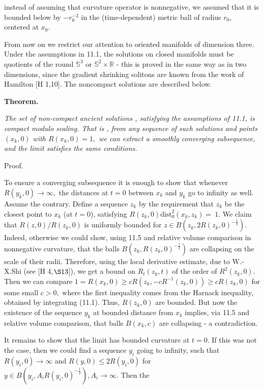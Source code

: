 \documentclass[12pt]{article}
\theoremstyle{plain}
{\swapnumbers
\newtheorem{thm}{Theorem}[section]
\newtheorem{cor}[thm]{Corollary}
\newtheorem{lem}[thm]{Lemma}
\newtheorem{prop}[thm]{Proposition}
}
\theoremstyle{definition}
{\swapnumbers
\newtheorem{defn}[thm]{Definition}
\newtheorem{nota}[thm]{Notation}
\newtheorem{parag}[thm]{}
\newtheorem*{parstr}{\addtocounter{thm}{1}\thesection.\arabic{thm}*}
\newtheorem*{intropar}{\addtocounter{thm}{1}\arabic{thm}}
}
\theoremstyle{remark} {\swapnumbers
\newtheorem{rem}[thm]{Remark}
\newtheorem{exam}[thm]{Example}
\newtheorem{lemma}[thm]{Lemma}
\newtheorem{claim}[thm]{Claim}
}
\numberwithin{equation}{section}
\begin{document}
 instead of assuming that curvature operator is nonnegative, we
 assumed that it is bounded below by $-r_0^{-2}$ in the
 (time-dependent) metric ball of radius $r_0,$ centered at $x_0.$
 \begin{parag} From now on we restrict our attention to oriented manifolds of dimension
  three. Under the assumptions in 11.1, the solutions on closed
  manifolds must be quotients of the round $\mathbb{S}^3$ or $\mathbb{S}^2\times\mathbb{R}$ - this is proved
  in the same way as in two dimensions, since the gradient
  shrinking solitons are known from the work of Hamilton [H 1,10]. The
  noncompact solutions are described below.
  \par
  {\bf Theorem.}{\it The set of non-compact ancient solutions , satisfying the
  assumptions of 11.1, is compact modulo scaling. That is , from
  any sequence of such solutions and points $(x_k,0)$ with
  $R(x_k,0)=1,$ we can extract a smoothly converging subsequence,
  and the limit satisfies the same conditions. \par Proof.} To
  ensure a converging subsequence it is enough to show that
  whenever $R(y_k,0)\to\infty,$ the distances at $t=0$ between
  $x_k$ and $y_k$ go to infinity as well. Assume the contrary.
  Define a sequence $z_k$ by the requirement that $z_k$ be the
  closest point to $x_k$ (at $t=0$), satisfying
  $R(z_k,0)\mbox{dist}_0^2(x_k,z_k)=~1.$ We claim that
  $R(z,0)/R(z_k,0)$ is uniformly bounded for
  $z\in B(z_k,2R(z_k,0)^{-\frac{1}{2}}).$ Indeed, otherwise we could
  show, using 11.5 and relative volume comparison in nonnegative
  curvature, that the balls $B(z_k,R(z_k,0)^{-\frac{1}{2}})$ are
  collapsing on the scale of their radii. Therefore, using the
  local derivative estimate, due to W.-X.Shi (see [H 4,$\S 13$]), we get a bound on
  $R_t(z_k,t)$ of the order of $R^2(z_k,0).$ Then we can compare
  $1=R(x_k,0)\ge cR(z_k,-cR^{-1}(z_k,0))\ge cR(z_k,0)$ for some
  small $c>0, $ where the first inequality comes from the Harnack
  inequality, obtained by integrating (11.1). Thus, $R(z_k,0)$ are
  bounded. But now the existence of the sequence $y_k$ at bounded
  distance from $x_k$ implies, via 11.5 and relative volume
  comparison, that balls $B(x_k,c)$ are collapsing - a
  contradiction. \par It remains to show that the limit has
  bounded curvature at $t=0.$ If this was not the case, then we
  could find a sequence $y_i$ going to infinity, such that
  $R(y_i,0)\to\infty$ and $R(y,0)\le 2R(y_i,0)$ for $y\in
  B(y_i,A_iR(y_i,0)^{-\frac{1}{2}}), A_i\to\infty .$ Then the

\end{parag}
\end{document}
